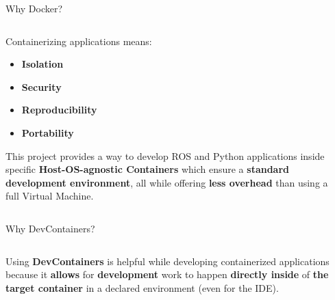 \begin{frame}{Why Docker?}
    \begin{columns}
        \begin{column}{.75\linewidth}
            Containerizing applications means:
            \begin{itemize}
                \item \textbf{Isolation}
                \item \textbf{Security}
                \item \textbf{Reproducibility}
                \item \textbf{Portability}
            \end{itemize}

            This project provides a way to develop ROS and Python applications inside specific \textbf{Host-OS-agnostic Containers} which ensure a \textbf{standard development environment}, all while offering \textbf{less overhead} than using a full Virtual Machine.
        \end{column}
        \begin{column}{.25\linewidth}
            \begin{center}
                
            \end{center}
        \end{column}
    \end{columns}
\end{frame}
\begin{frame}{Why DevContainers?}
    \begin{columns}
        \begin{column}{.75\linewidth}
            Using \textbf{DevContainers} is helpful while developing containerized applications because it \textbf{allows} for \textbf{development} work to happen \textbf{directly inside} of \textbf{the target container} in a declared environment (even for the IDE).
        \end{column}
        \begin{column}{.25\linewidth}
            \begin{center}
                
            \end{center}
        \end{column}
    \end{columns}
\end{frame}